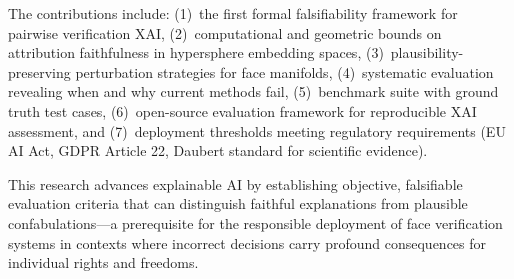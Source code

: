 The contributions include: (1)~the first formal falsifiability framework for pairwise verification XAI, (2)~computational and geometric bounds on attribution faithfulness in hypersphere embedding spaces, (3)~plausibility-preserving perturbation strategies for face manifolds, (4)~systematic evaluation revealing when and why current methods fail, (5)~benchmark suite with ground truth test cases, (6)~open-source evaluation framework for reproducible XAI assessment, and (7)~deployment thresholds meeting regulatory requirements (EU AI Act, GDPR Article 22, Daubert standard for scientific evidence).

This research advances explainable AI by establishing objective, falsifiable evaluation criteria that can distinguish faithful explanations from plausible confabulations---a prerequisite for the responsible deployment of face verification systems in contexts where incorrect decisions carry profound consequences for individual rights and freedoms.
